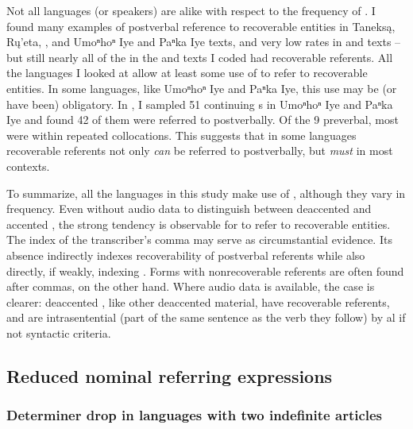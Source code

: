 \documentclass[output=paper]{LSP/langsci}
\begin{document}
Not all languages (or speakers) are alike with respect to the frequency of . I found many examples of postverbal reference to recoverable entities in Taneksą, Rų’eta, , and Umoⁿhoⁿ Iye and Paⁿka Iye texts, and very low rates in  and  texts -- but still nearly all of the  in the  and  texts I coded had recoverable referents. All the languages I looked at allow at least some use of  to refer to recoverable entities. In some languages, like Umoⁿhoⁿ Iye and Paⁿka Iye, this use may be (or have been) obligatory. In \citet{Gordon2008}, I sampled 51 continuing s in Umoⁿhoⁿ Iye and Paⁿka Iye and found 42 of them were referred to postverbally. Of the 9 preverbal, most were within repeated collocations. This suggests that in some languages recoverable referents not only \emph{can} be referred to postverbally, but \emph{must} in most contexts.

To summarize, all the languages in this study make use of , although they vary in frequency. Even without audio data to distinguish between deaccented and accented , the strong tendency is observable for  to refer to recoverable entities. The index of the transcriber’s comma may serve as circumstantial evidence. Its absence indirectly indexes recoverability of postverbal referents while also directly, if weakly, indexing . Forms with nonrecoverable referents are often found after commas, on the other hand. Where audio data is available, the case is clearer: deaccented , like other deaccented material, have recoverable referents, and are intrasentential (part of the same sentence as the verb they follow) by al if not syntactic criteria.

\subsection{Reduced nominal referring expressions}\label{nominalreduction}

\subsubsection{Determiner drop in languages with two indefinite articles}\label{droptwoindef}
\end{document}
